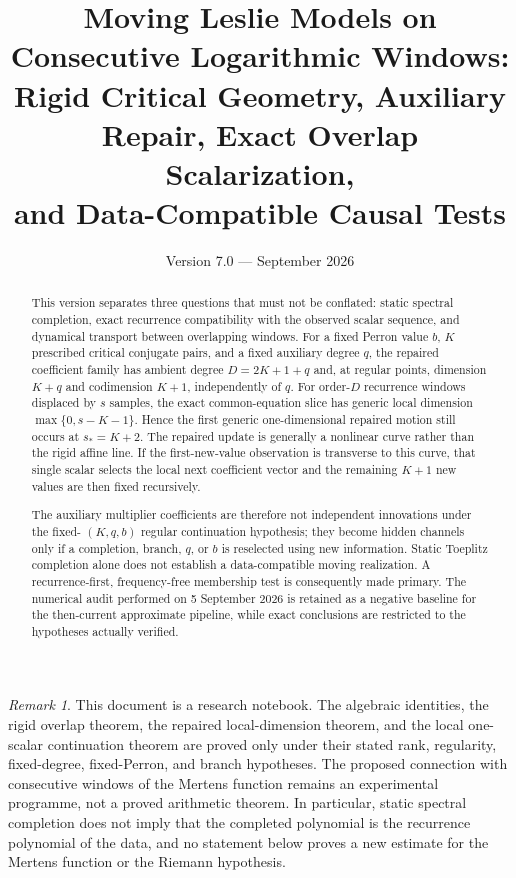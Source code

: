 \documentclass[11pt]{amsart}
\title[Moving Leslie Models]{Moving Leslie Models on Consecutive Logarithmic Windows:\\Rigid Critical Geometry, Auxiliary Repair, Exact Overlap Scalarization,\\and Data-Compatible Causal Tests}
\author{}
\date{Version 7.0 --- September 2026}
\numberwithin{equation}{section}
\theoremstyle{plain}
\theoremstyle{definition}
\theoremstyle{remark}
\newtheorem{remark}[theorem]{Remark}
\begin{document}
\begin{abstract}
This version separates three questions that must not be conflated: static spectral completion,
exact recurrence compatibility with the observed scalar sequence, and dynamical transport between
overlapping windows. For a fixed Perron value $b$, $K$ prescribed critical conjugate pairs, and a
fixed auxiliary degree $q$, the repaired coefficient family has ambient degree $D=2K+1+q$ and,
at regular points, dimension $K+q$ and codimension $K+1$, independently of $q$. For order-$D$
recurrence windows displaced by $s$ samples, the exact common-equation slice has generic local
dimension $\max\{0,s-K-1\}$. Hence the first generic one-dimensional repaired motion still occurs
at $s_*=K+2$. The repaired update is generally a nonlinear curve rather than the rigid affine line.
If the first-new-value observation is transverse to this curve, that single scalar selects the local
next coefficient vector and the remaining $K+1$ new values are then fixed recursively.

The auxiliary multiplier coefficients are therefore not independent innovations under the fixed-
$(K,q,b)$ regular continuation hypothesis; they become hidden channels only if a completion,
branch, $q$, or $b$ is reselected using new information. Static Toeplitz completion alone does not
establish a data-compatible moving realization. A recurrence-first, frequency-free membership test
is consequently made primary. The numerical audit performed on 5 September 2026 is retained as a
negative baseline for the then-current approximate pipeline, while exact conclusions are restricted
to the hypotheses actually verified.
\end{abstract}
\maketitle

\tableofcontents
\bigskip

\begin{remark}
\label{rem:status}
This document is a research notebook.  The algebraic identities, the rigid overlap theorem,
the repaired local-dimension theorem, and the local one-scalar continuation theorem are proved
only under their stated rank, regularity, fixed-degree, fixed-Perron, and branch hypotheses.
The proposed connection with consecutive windows of the Mertens function remains an experimental
programme, not a proved arithmetic theorem.  In particular, static spectral completion does not
imply that the completed polynomial is the recurrence polynomial of the data, and no statement
below proves a new estimate for the Mertens function or the Riemann hypothesis.
\end{remark}
\end{document}

